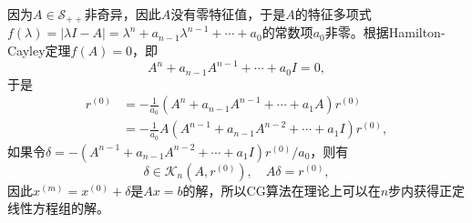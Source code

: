 \documentclass[a4paper,10pt]{ctexart}
\begin{document}
因为$ A\in \mathcal{S}_{++} $非奇异，因此$ A $没有零特征值，于是$ A $的特征多项式$ f(\lambda) = |\lambda I - A| = \lambda^n + a_{n-1}\lambda^{n-1}+\cdots +a_{0} $的常数项$ a_0 $非零。根据Hamilton-Cayley定理$ f(A) = 0 $，即
\[
    A^n + a_{n-1}A^{n-1} + \cdots + a_0I = 0,
\]
于是
\[
    \begin{aligned}
        r^{(0)} &= - \frac{1}{a_0} (A^n + a_{n-1}A^{n-1} + \cdots +a_1A)r^{(0)}\\
        &= - \frac{1}{a_0} A(A^{n-1} + a_{n-1}A^{n-2} + \cdots +a_1I)r^{(0)},
    \end{aligned}
\]
如果令$ \delta = -(A^{n-1} + a_{n-1}A^{n-2} + \cdots +a_1I)r^{(0)} / a_0 $，则有
\[
    \delta \in \mathcal{K}_n(A,r^{(0)}),\quad A\delta = r^{(0)},
\]
因此$ x^{(m)} = x^{(0)} + \delta $是$ Ax = b $的解，所以CG算法在理论上可以在$ n $步内获得正定线性方程组的解。
\end{document}
